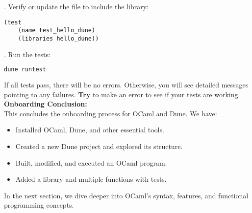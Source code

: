 
. Verify or update the  file to include the library:
   \begin{lstlisting}[language=PlainText, caption={Test Dune File}]
   (test
    (name test_hello_dune)
    (libraries hello_dune))
   \end{lstlisting}

. Run the tests:
   \begin{lstlisting}[language=Bash]
   dune runtest
   \end{lstlisting}

   \noindent If all tests pass, there will be no errors. Otherwise, you will see detailed messages
   pointing to any failures. \textbf{Try} to make an error to see if your tests are working.\\

\noindent
\textbf{Onboarding Conclusion:}\\

\vspace{-.5em}
\noindent
This concludes the onboarding process for OCaml and Dune. We have:
\begin{itemize}
    \item Installed OCaml, Dune, and other essential tools.
    \item Created a new Dune project and explored its structure.
    \item Built, modified, and executed an OCaml program.
    \item Added a library and multiple functions with tests.
\end{itemize}

\noindent
In the next section, we dive deeper into OCaml's syntax, features, and functional programming concepts.

\newpage